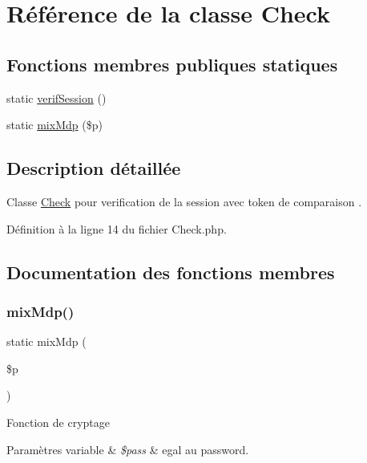 \hypertarget{class_app_1_1_check}{}\section{Référence de la classe Check}
\label{class_app_1_1_check}
\subsection*{Fonctions membres publiques statiques}
\begin{DoxyCompactItemize}
\item 
static \hyperlink{class_app_1_1_check_a762802022c6341f5a11a5bd2d24e374a}{verif\+Session} ()
\item 
static \hyperlink{class_app_1_1_check_a6ad7e08262ba342da3f69a34a5536eb6}{mix\+Mdp} (\$p)
\end{DoxyCompactItemize}


\subsection{Description détaillée}
Classe \hyperlink{class_app_1_1_check}{Check} pour verification de la session avec token de comparaison . 

Définition à la ligne 14 du fichier Check.\+php.



\subsection{Documentation des fonctions membres}
\mbox{\label{class_app_1_1_check_a6ad7e08262ba342da3f69a34a5536eb6}} 
\subsubsection{\texorpdfstring{mix\+Mdp()}{mixMdp()}}
{\footnotesize\ttfamily static mix\+Mdp (\begin{DoxyParamCaption}\item[{}]{\$p }\end{DoxyParamCaption})\hspace{0.3cm}{\ttfamily [static]}}

Fonction de cryptage 
\begin{DoxyParams}[1]{Paramètres}
variable & {\em \$pass} & egal au password. \\
\hline
\end{DoxyParams}


